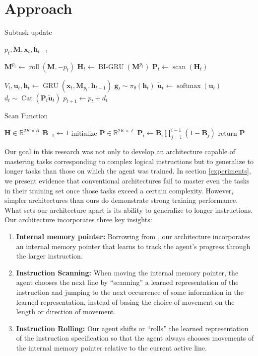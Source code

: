 \documentclass{article}
\newcommand{\algo}[3][
    \STATE $V_t, \mathbf{u}_t, \mathbf{h}_t  \gets \GRU\left(\mathbf{x}_t, \mathbf{M}_{p_t}, \mathbf{h}_{t-1}\right)$
    \STATE $\mathbf{g}_{t} \sim \pi_\theta\left(\mathbf{h}_t\right)$
    \STATE $\tilde{\mathbf{u}}_{t} \gets \softmax\left(\mathbf{u}_t\right)$
    \STATE $d_{t} \sim \Cat\left(\mathbf{P}_t\tilde{\mathbf{u}}_t\right)$ 
    \STATE $p_{t + 1} \gets p_t + d_t$
]
{

\begin{algorithm}[b]
  \caption{#2}
  \label{multi-line}
  \begin{algorithmic}[1]
    \STATE {\bfseries Inputs:} $p_t, \mathbf{M} , \mathbf{x}_t, \mathbf{h}_{t-1}$
    #3
    #1
  \end{algorithmic}
\end{algorithm}
}
\DeclareMathOperator{\GRU}{GRU}
\DeclareMathOperator{\BIGRU}{BI-GRU}
\DeclareMathOperator{\Cat}{Cat}
\DeclareMathOperator{\roll}{roll}
\DeclareMathOperator{\scan}{scan}
\DeclareMathOperator{\softmax}{softmax}
\begin{document}
\section{Approach}
\algo{Subtask update}{
    \STATE $\mathbf{M}^{p_t} \gets \roll\left(\mathbf{M}, -p_t\right)$
    \STATE ${\mathbf{H}_t} \gets \BIGRU\left(\mathbf{M}^{p_t}\right)$
    \STATE ${\mathbf{P}_t \gets \scan\left(\mathbf{H}_t\right)}$
}{}{}
\begin{algorithm}[b]
  \caption{Scan Function}
  \label{scan}
  \begin{algorithmic}[1]
$\mathbf{H} \in \mathbb{R}^{2K \times H}$ 
\STATE $\mathbf{B}_{-1} \gets 1$  
\STATE initialize $\mathbf{P} \in \mathbb{R}^{2K \times \ell}$
\STATE $\mathbf{P}_i \gets \mathbf{B}_i\prod_{j=1}^{i-1}\left(1 - \mathbf{B}_j\right)$
\ENDFOR
\STATE return $\mathbf{P}$
  \end{algorithmic}
\end{algorithm}

\label{approach}
Our goal in this research was not only to develop an architecture capable of
mastering tasks corresponding to complex logical instructions but to generalize
to longer tasks than those on which the agent was trained.
In section \ref{experiments}, we present evidence that conventional architectures
fail to master even the tasks in their training set once those tasks exceed a
certain complexity.
However, simpler architectures than ours do demonstrate strong training
performance.  What sets our architecture apart is
its ability to generalize to longer instructions. Our architecture incorporates three
key insights:

\begin{enumerate}
  \item \textbf{Internal memory pointer:} Borrowing from \cite{oh2017zero}, our architecture incorporates an
    internal memory pointer that learns to track the agent's progress through
    the larger instruction.
  \item \textbf{Instruction Scanning:} When moving the internal memory pointer, the agent
    chooses the next line by ``scanning'' a learned representation of the  instruction and
    jumping to the next occurrence of some information in the learned
    representation, instead of basing the choice of movement on
    the length or direction of movement.
  \item \textbf{Instruction Rolling:} Our agent shifts or ``rolls'' the learned representation of the instruction
    specification so that the agent always chooses movements of the internal memory pointer
    relative to the current active line.
\end{enumerate}
\end{document}

